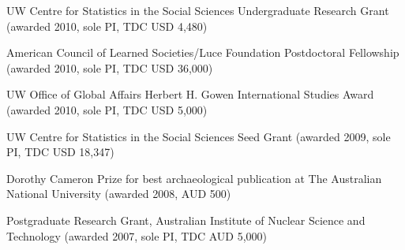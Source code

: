 \ind UW Centre for Statistics in the Social Sciences Undergraduate Research Grant (awarded 2010, sole PI, TDC USD 4,480)

\ind American Council  of Learned Societies/Luce Foundation Postdoctoral Fellowship (awarded 2010, sole PI, TDC USD 36,000)

\ind UW Office of Global Affairs Herbert H. Gowen International Studies Award (awarded 2010, sole  PI, TDC USD 5,000)

\ind UW Centre for Statistics in the Social Sciences Seed Grant (awarded 2009, sole PI, TDC USD 18,347)

\ind Dorothy Cameron Prize for best archaeological publication at The Australian National University (awarded 2008, AUD 500)

\ind Postgraduate Research Grant, Australian Institute of Nuclear Science and Technology (awarded 2007, sole PI, TDC AUD 5,000)